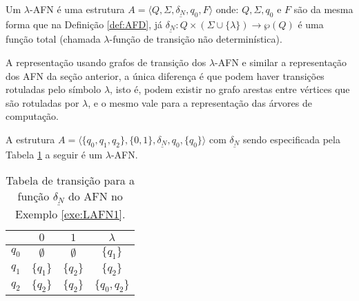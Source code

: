 \begin{definicao}\label{def:LAFN}
	Um $\lambda$-AFN é uma estrutura $A = \langle Q, \Sigma, \underline{\delta_N}, q_0, F\rangle$ onde: $Q, \Sigma, q_0$ e $F$ são da mesma forma que na Definição \ref{def:AFD}, já $\underline{\delta_N} : Q \times (\Sigma \cup \{\lambda\}) \rightarrow \wp(Q)$ é uma função total (chamada $\lambda$-função de transição não determinística).
\end{definicao}

A representação usando grafos de transição dos $\lambda$-AFN e similar a representação dos AFN da seção anterior, a única diferença é que podem haver transições rotuladas pelo símbolo $\lambda$, isto é, podem existir no grafo arestas entre vértices que são rotuladas por $\lambda$, e o mesmo vale para a representação das árvores de computação.

\begin{exemplo}\label{exe:LAFN1}
	A estrutura $A = \langle \{q_0, q_1, q_2\}, \{0,1\}, \underline{\delta_N}, q_0, \{q_0\}\rangle$ com $\underline{\delta_N}$ sendo especificada pela Tabela \ref{tab:DeltaLAFN1} a seguir é um $\lambda$-AFN.
	
	\begin{table}[H]
		\centering
		\begin{tabular}{c|ccc}
			\backslashbox{$Q$}{$\Sigma \cup \{\lambda\}$}	& $0$ & $1$ & $\lambda$\\ \hline
			$q_0$  & $\emptyset$ & $\emptyset$ & $\{q_1\}$\\
			$q_1$  & $\{q_1\}$ & $\{q_2\}$ & $\{q_2\}$\\
			$q_2$  & $\{q_2\}$ & $\{q_2\}$ & $\{q_0, q_2\}$ \\ \hline
		\end{tabular}
		\caption{Tabela de transição para a função $\underline{\delta_N}$ do AFN no Exemplo \ref{exe:LAFN1}.}
		\label{tab:DeltaLAFN1}
	\end{table}
\end{exemplo} 


